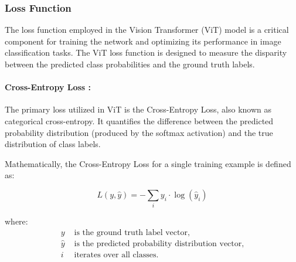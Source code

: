 \subsubsection{Loss Function}
The loss function employed in the Vision Transformer (ViT) model is a critical component for training the network and optimizing its performance in image classification tasks. The ViT loss function is designed to measure the disparity between the predicted class probabilities and the ground truth labels.

\paragraph{Cross-Entropy Loss :}
The primary loss utilized in ViT is the Cross-Entropy Loss, also known as categorical cross-entropy. It quantifies the difference between the predicted probability distribution (produced by the softmax activation) and the true distribution of class labels.

Mathematically, the Cross-Entropy Loss for a single training example is defined as:

\begin{equation}
    L(y, \hat{y}) = -\sum_i y_i \cdot \log(\hat{y}_i) \label{eq:loss_function}
\end{equation}

where:
\begin{align*}
    y       & \text{ is the ground truth label vector,}                 \\
    \hat{y} & \text{ is the predicted probability distribution vector,} \\
    i       & \text{ iterates over all classes.}
\end{align*}

